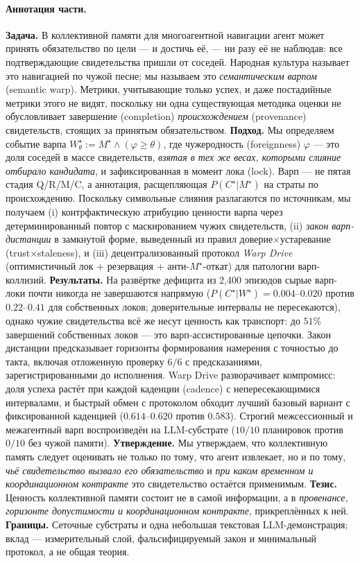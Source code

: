 \documentclass{article}
\newcommand{\wstar}{W^{\star}}
\newcommand{\mstar}{M^{\star}}
\newcommand{\cstar}{C^{\star}}
\begin{document}
\paragraph{Аннотация части.} \textbf{Задача.} В коллективной памяти для многоагентной навигации агент может принять обязательство по цели --- и достичь её, --- ни разу её не наблюдав: все подтверждающие свидетельства пришли от соседей. Народная культура называет это навигацией по чужой песне; мы называем это \emph{семантическим варпом} (semantic warp). Метрики, учитывающие только успех, и даже постадийные метрики этого не видят, поскольку ни одна существующая методика оценки не обусловливает завершение (completion) \emph{происхождением} (provenance) свидетельств, стоящих за принятым обязательством.
\textbf{Подход.} Мы определяем событие варпа $\wstar_\theta := \mstar \wedge (\varphi \ge \theta)$, где чужеродность (foreignness) $\varphi$ --- это доля соседей в массе свидетельств, \emph{взятая в тех же весах, которыми слияние отбирало кандидата}, и зафиксированная в момент лока (lock). Варп --- не пятая стадия Q/R/M/C, а аннотация, расщепляющая $P(\cstar|\mstar)$ на страты по происхождению. Поскольку символьные слияния разлагаются по источникам, мы получаем (i) контрфактическую атрибуцию ценности варпа через детерминированный повтор с маскированием чужих свидетельств, (ii) \emph{закон варп-дистанции} в замкнутой форме, выведенный из правил доверие$\times$устаревание (trust$\times$staleness), и (iii) децентрализованный протокол \emph{Warp Drive} (оптимистичный лок + резервация + анти-$\mstar$-откат) для патологии варп-коллизий.
\textbf{Результаты.} На развёртке дефицита из 2{,}400 эпизодов сырые варп-локи почти никогда не завершаются напрямую ($P(\cstar|\wstar)=0.004$--$0.020$ против $0.22$--$0.41$ для собственных локов; доверительные интервалы не пересекаются), однако чужие свидетельства всё же несут ценность как транспорт: до $51\%$ завершений собственных локов --- это варп-ассистированные цепочки. Закон дистанции предсказывает горизонты формирования намерения с точностью до такта, включая отложенную проверку $6/6$ с предсказаниями, зарегистрированными до исполнения. Warp Drive разворачивает компромисс: доля успеха растёт при каждой каденции (cadence) с непересекающимися интервалами, и быстрый обмен с протоколом обходит лучший базовый вариант с фиксированной каденцией ($0.614$--$0.620$ против $0.583$). Строгий межсессионный и межагентный варп воспроизведён на LLM-субстрате ($10/10$ планировок против $0/10$ без чужой памяти).
\textbf{Утверждение.} Мы утверждаем, что коллективную память следует оценивать не только по тому, что агент извлекает, но и по тому, \emph{чьё свидетельство вызвало его обязательство} и \emph{при каком временном и координационном контракте} это свидетельство остаётся применимым.
\textbf{Тезис.} Ценность коллективной памяти состоит не в самой информации, а в \emph{провенансе, горизонте допустимости и координационном контракте}, прикреплённых к ней.
\textbf{Границы.} Сеточные субстраты и одна небольшая текстовая LLM-демонстрация; вклад --- измерительный слой, фальсифицируемый закон и минимальный протокол, а не общая теория.
\end{document}
